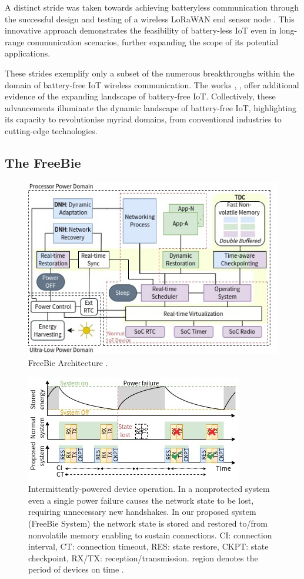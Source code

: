 \noindent A distinct stride was taken towards achieving batteryless communication through the successful design and testing of a wireless LoRaWAN end sensor node \cite{9299539}. This innovative approach demonstrates the feasibility of battery-less IoT even in long-range communication scenarios, further expanding the scope of its potential applications.
\vspace{1\baselineskip}

\noindent These strides exemplify only a subset of the numerous breakthroughs within the domain of battery-free IoT wireless communication. The works \cite{9718062}, \cite{10101211}, \cite{10.1145/3276774.3282823} offer additional evidence of the expanding landscape of battery-free IoT. Collectively, these advancements illuminate the dynamic landscape of battery-free IoT, highlighting its capacity to revolutionise myriad domains, from conventional industries to cutting-edge technologies.

\subsection{The FreeBie}
\label{sec:freebie_architecture}

\begin{figure}[t]
    \centering
    \includegraphics[width=0.6\linewidth]{chapters/Literature/diagram.jpg}
    \caption{FreeBie Architecture \cite{de2022Intermittently}.}
    \label{fig:freebie_paper_arch}
\end{figure}
\begin{figure}[t]
    \centering
    \includegraphics[width=0.6\linewidth]{chapters/Literature/intro.jpg}
    \caption{Intermittently-powered device operation. In a nonprotected system even a single power failure causes the network state to be lost, requiring unnecessary new handshakes. In our proposed system (FreeBie System) the network state is stored and restored to/from nonvolatile memory enabling to sustain connections. CI: connection interval, CT: connection timeout, RES: state restore, CKPT: state checkpoint, RX/TX: reception/transmission. region denotes the period of devices on time \cite{de2022Intermittently}.}
    \label{fig:freebie_paper_conn}
\end{figure}

